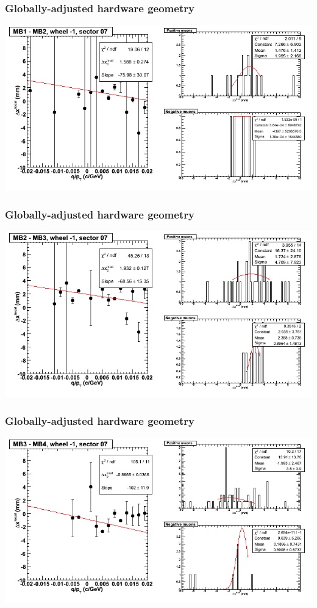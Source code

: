 \documentclass[compress]{beamer}
\begin{document}
\begin{frame}
\frametitle{Globally-adjusted hardware geometry}
\includegraphics[width=\linewidth]{NOV4_segdiffs_HW/dt13_resid_B_07_12.png}
\end{frame}

\begin{frame}
\frametitle{Globally-adjusted hardware geometry}
\includegraphics[width=\linewidth]{NOV4_segdiffs_HW/dt13_resid_B_07_23.png}
\end{frame}

\begin{frame}
\frametitle{Globally-adjusted hardware geometry}
\includegraphics[width=\linewidth]{NOV4_segdiffs_HW/dt13_resid_B_07_34.png}
\end{frame}
\end{document}
